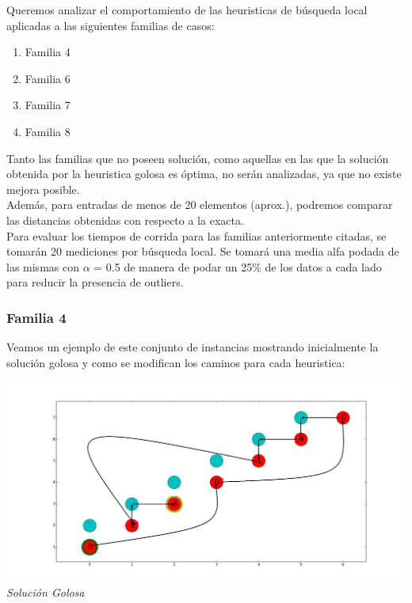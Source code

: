 Queremos analizar el comportamiento de las heuristicas de búsqueda local aplicadas a las siguientes familias de casos:

\begin{enumerate}
\item Familia 4
\item Familia 6
\item Familia 7
\item Familia 8
\end{enumerate}

Tanto las familias que no  poseen solución, como aquellas en las que la solución obtenida por la heuristica golosa es óptima, no serán analizadas, ya que no existe mejora posible.\\

Además, para entradas de menos de 20 elementos (aprox.), podremos comparar las distancias obtenidas con respecto a la exacta.\\
 
Para evaluar los tiempos de corrida para las familias anteriormente citadas, se tomarán 20 mediciones por búsqueda local. Se tomará una media alfa podada de las mismas con $\alpha$ = 0.5 de manera de podar un 25\% de los datos a cada lado para reducir la presencia de outliers.

\subsubsection*{Familia 4}

Veamos un ejemplo de este conjunto de instancias mostrando inicialmente la soluci\'on golosa y como se modifican los caminos para cada heuristica:

\vspace*{0.3cm} \vspace*{0.3cm}
  \begin{center}
 \includegraphics[scale=0.3]{./EJ3/gym0goloso.png}\\
 {            \textit{Soluci\'on Golosa}}
  \end{center}
  \vspace*{0.3cm}

